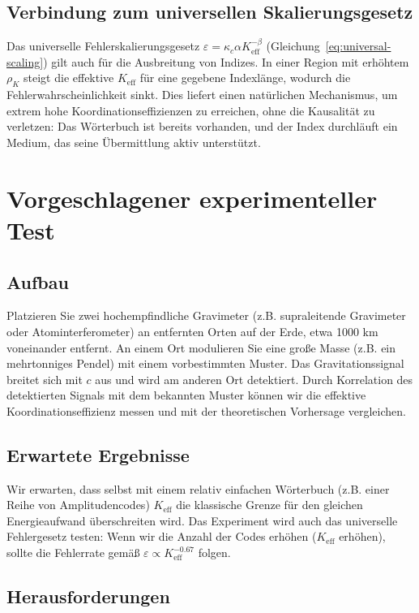 \documentclass[12pt,a4paper]{article}
\newcommand{\Keff}{K_{\mathrm{eff}}}
\newcommand{\kappac}{\kappa_c}
\newcommand{\eps}{\varepsilon}
\begin{document}
	\subsection{Verbindung zum universellen Skalierungsgesetz}
	
	Das universelle Fehlerskalierungsgesetz \(\eps = \kappac\alpha\Keff^{-\beta}\) (Gleichung~\ref{eq:universal-scaling}) gilt auch für die Ausbreitung von Indizes. In einer Region mit erhöhtem \(\rho_K\) steigt die effektive \(\Keff\) für eine gegebene Indexlänge, wodurch die Fehlerwahrscheinlichkeit sinkt. Dies liefert einen natürlichen Mechanismus, um extrem hohe Koordinationseffizienzen zu erreichen, ohne die Kausalität zu verletzen: Das Wörterbuch ist bereits vorhanden, und der Index durchläuft ein Medium, das seine Übermittlung aktiv unterstützt.
	
	\section{Vorgeschlagener experimenteller Test}
	\label{sec:experiment}
	
	\subsection{Aufbau}
	
	Platzieren Sie zwei hochempfindliche Gravimeter (z.B. supraleitende Gravimeter oder Atominterferometer) an entfernten Orten auf der Erde, etwa 1000 km voneinander entfernt. An einem Ort modulieren Sie eine große Masse (z.B. ein mehrtonniges Pendel) mit einem vorbestimmten Muster. Das Gravitationssignal breitet sich mit \(c\) aus und wird am anderen Ort detektiert. Durch Korrelation des detektierten Signals mit dem bekannten Muster können wir die effektive Koordinationseffizienz messen und mit der theoretischen Vorhersage vergleichen.
	
	\subsection{Erwartete Ergebnisse}
	
	Wir erwarten, dass selbst mit einem relativ einfachen Wörterbuch (z.B. einer Reihe von Amplitudencodes) \(\Keff\) die klassische Grenze für den gleichen Energieaufwand überschreiten wird. Das Experiment wird auch das universelle Fehlergesetz testen: Wenn wir die Anzahl der Codes erhöhen (\(\Keff\) erhöhen), sollte die Fehlerrate gemäß \(\eps \propto \Keff^{-0.67}\) folgen.
	
	\subsection{Herausforderungen}
	
\end{document}

